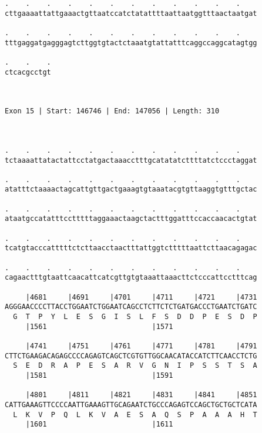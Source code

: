 \documentclass{article}
\begin{document}
\begin{Verbatim}
.    .    .    .    .    .    .    .    .    .    .    .    
cttgaaaattattgaaactgttaatccatctatattttaattaatggtttaactaatgat
                                                            
.    .    .    .    .    .    .    .    .    .    .    .    
tttgaggatgagggagtcttggtgtactctaaatgtattatttcaggccaggcatagtgg
                                                            
.    .    .
ctcacgcctgt
           
           
 
Exon 15 | Start: 146746 | End: 147056 | Length: 310



.    .    .    .    .    .    .    .    .    .    .    .    
tctaaaattatactattcctatgactaaacctttgcatatatcttttatctccctaggat
                                                            
.    .    .    .    .    .    .    .    .    .    .    .    
atatttctaaaactagcattgttgactgaaagtgtaaatacgtgttaaggtgtttgctac
                                                            
.    .    .    .    .    .    .    .    .    .    .    .    
ataatgccatatttcctttttaggaaactaagctactttggatttccaccaacactgtat
                                                            
.    .    .    .    .    .    .    .    .    .    .    .    
tcatgtacccatttttctcttaacctaactttattggtctttttaattcttaacagagac
                                                            
.    .    .    .    .    .    .    .    .    .    .    .    
cagaactttgtaattcaacattcatcgttgtgtaaattaaacttctcccattcctttcag
                                                            
     |4681     |4691     |4701     |4711     |4721     |4731
AGGGAACCCCTTACCTGGAATCTGGAATCAGCCTCTTCTCTGATGACCCTGAATCTGATC
  G  T  P  Y  L  E  S  G  I  S  L  F  S  D  D  P  E  S  D  P
     |1561                         |1571                    
  
     |4741     |4751     |4761     |4771     |4781     |4791
CTTCTGAAGACAGAGCCCCAGAGTCAGCTCGTGTTGGCAACATACCATCTTCAACCTCTG
  S  E  D  R  A  P  E  S  A  R  V  G  N  I  P  S  S  T  S  A
     |1581                         |1591                    
  
     |4801     |4811     |4821     |4831     |4841     |4851
CATTGAAAGTTCCCCAATTGAAAGTTGCAGAATCTGCCCAGAGTCCAGCTGCTGCTCATA
  L  K  V  P  Q  L  K  V  A  E  S  A  Q  S  P  A  A  A  H  T
     |1601                         |1611                    
  

\end{Verbatim}
\end{document}
